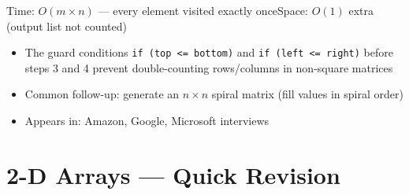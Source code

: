 \documentclass[12pt,a4paper,oneside]{book}
\begin{document}
\begin{complexity}
Time: $O(m \times n)$ --- every element visited exactly once\quad Space: $O(1)$ extra (output list not counted)
\end{complexity}

\begin{interviewcorner}
\begin{itemize}
  \item The guard conditions \texttt{if (top <= bottom)} and \texttt{if (left <= right)} before steps 3 and 4 prevent double-counting rows/columns in non-square matrices
  \item Common follow-up: generate an $n \times n$ spiral matrix (fill values in spiral order)
  \item Appears in: Amazon, Google, Microsoft interviews
\end{itemize}
\end{interviewcorner}

\section{2-D Arrays --- Quick Revision}
\end{document}
